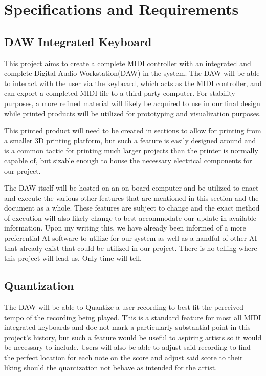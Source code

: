 \section{Specifications and Requirements}

\subsection{DAW Integrated Keyboard}

This project aims to create a complete MIDI controller with an integrated and complete
Digital Audio Workstation(DAW) in the system. The DAW will be able to interact with the
user via the keyboard, which acts as the MIDI controller, and can export a completed MIDI
file to a third party computer. For stability purposes, a more refined material will
likely be acquired to use in our final design while printed products will be utilized for
prototyping and visualization purposes.

This printed product will need to be created in sections to allow for printing from a
smaller 3D printing platform, but such a feature is easily designed around and is a common
tactic for printing much larger projects than the printer is normally capable of, but
sizable enough to house the necessary electrical components for our project.

The DAW itself will be hosted on an on board computer and be utilized to enact and execute
the various other features that are mentioned in this section and the document as a whole.
These features are subject to change and the exact method of execution will also likely
change to best accommodate our update in available information. Upon my writing this, we
have already been informed of a more preferential AI software to utilize for our system as
well as a handful of other AI that already exist that could be utilized in our project.
There is no telling where this project will lead us. Only time will tell.

\subsection{Quantization}

The DAW will be able to Quantize a user recording to best fit the perceived tempo of the
recording being played. This is a standard feature for most all MIDI integrated keyboards
and doe not mark a particularly substantial point in this project's history, but such a
feature would be useful to aspiring artists so it would be necessary to include. Users
will also be able to adjust said recording to find the perfect location for each note on
the score and adjust said score to their liking should the quantization not behave as
intended for the artist.

